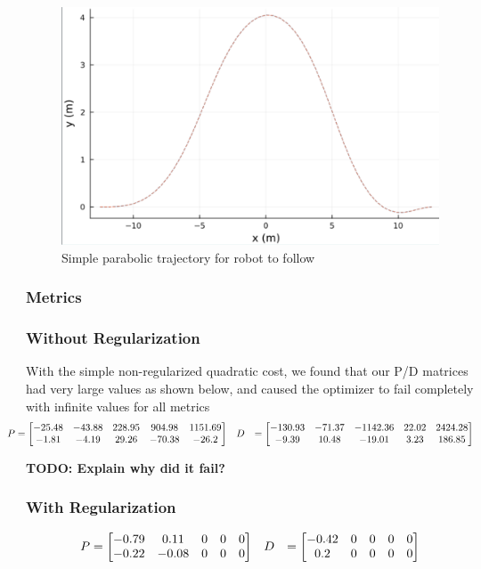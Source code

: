 \documentclass[11pt]{article}
\begin{document}
    \begin{figure}[h!]
        \centering
        \includegraphics[width=0.5\linewidth]{trajectory}
        \caption{Simple parabolic trajectory for robot to follow}
        \label{fig:trajectory}
    \end{figure}

    \subsubsection{Metrics} \label{sec:results:metrics}
    

    \subsubsection{Without Regularization} \label{sec:results:singletraj:noreg}
    With the simple non-regularized quadratic cost, we found that our P/D matrices had very large values as shown below, and caused the optimizer to fail completely with infinite values for all metrics
        \begin{align*}
            \hspace{-2em}
            P &= \bmat{-25.48 & -43.88 & 228.95 & 904.98 & 1151.69 \\
                -1.81 & -4.19 & 29.26 & -70.38 & -26.2} && 
            D &
            = \bmat{-130.93 & -71.37 & -1142.36 & 22.02 & 2424.28 \\
                -9.39 & 10.48  & -19.01 & 3.23 & 186.85}
        \end{align*}
    
    \textbf{TODO: Explain why did it fail?}
    
    \subsubsection{With Regularization} \label{sec:results:singletraj:wreg}
        \begin{align*}
            P &= \begin{bmatrix}-0.79 & 0.11 & 0 & 0 & 0 \\ -0.22 & -0.08 & 0 & 0 & 0\end{bmatrix} && 
            D &= \begin{bmatrix}-0.42 & 0 & 0 & 0 & 0 \\  0.2 & 0 & 0 & 0 & 0\end{bmatrix}
        \end{align*}
    
\end{document}
